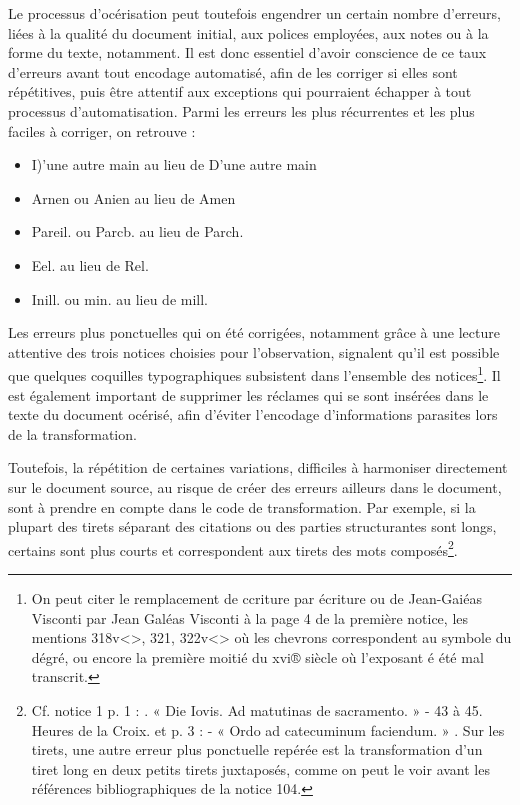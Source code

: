 \documentclass[a4paper,12pt,twoside]{book}
\begin{document}
	Le processus d'océrisation peut toutefois engendrer un certain nombre d'erreurs, liées à la qualité du document initial, aux polices employées, aux notes ou à la forme du texte, notamment. Il est donc essentiel d'avoir conscience de ce taux d'erreurs avant tout encodage automatisé, afin de les corriger si elles sont répétitives, puis être attentif aux exceptions qui pourraient échapper à tout processus d'automatisation.
	Parmi les erreurs les plus récurrentes et les plus faciles à corriger, on retrouve :
	\begin{itemize}
	    \item \og I)’une autre main\fg{} au lieu de \og D’une autre main\fg{}
	    \item \og Arnen\fg{} ou \og Anien\fg{} au lieu de \og Amen\fg{}
	    \item \og Pareil.\fg{} ou \og Parcb.\fg{} au lieu de \og Parch.\fg{}
	    \item \og Eel.\fg{} au lieu de \og Rel.\fg{}
	    \item \og Inill.\fg{} ou \og min.\fg{} au lieu de \og mill.\fg{}
	\end{itemize}
	
	Les erreurs plus ponctuelles qui on été corrigées, notamment grâce à une lecture attentive des trois notices choisies pour l'observation, signalent qu'il est possible que quelques coquilles typographiques subsistent dans l'ensemble des notices\footnote{On peut citer le remplacement de \og ccriture\fg{} par \og écriture\fg{} ou de \og Jean-Gaiéas Visconti\fg{} par \og Jean Galéas Visconti\fg{} à la page 4 de la première notice, les mentions \og 318v<>, 321, 322v<> \fg{} où les chevrons correspondent au symbole du dégré, ou encore \og la première moitié du xvi® siècle\fg{} où l'exposant é été mal transcrit.}. Il est également important de supprimer les réclames qui se sont insérées dans le texte du document océrisé, afin d'éviter l'encodage d'informations parasites lors de la transformation.
	
	Toutefois, la répétition de certaines variations, difficiles à harmoniser directement sur le document source, au risque de créer des erreurs ailleurs dans le document, sont à prendre en compte dans le code de transformation. Par exemple, si la plupart des tirets séparant des citations ou des parties structurantes sont longs, certains sont plus courts et correspondent aux tirets des mots composés\footnote{Cf. notice 1 p. 1 : . « Die Iovis. Ad matutinas de sacramento. » - 43 à 45. Heures de la Croix.\fg{} et p. 3 : - « Ordo ad catecuminum faciendum. » \fg{}. Sur les tirets, une autre erreur plus ponctuelle repérée est la transformation d'un tiret long en deux petits tirets juxtaposés, comme on peut le voir avant les références bibliographiques de la notice 104.}. 
	
\end{document}
